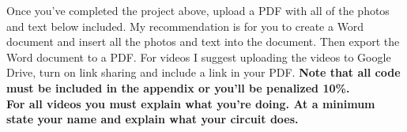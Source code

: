 Once you've completed the project above, upload a PDF with all of the photos and text
below included. My recommendation is for you to create a Word document
and insert all the photos and text into the document. Then export the
Word document to a PDF. For videos I suggest uploading the videos to
Google Drive, turn on link sharing and include a link in your
PDF. {\bf Note that all code must be included in the appendix or you'll be
penalized 10\%.}
\ \\

{\bf For all videos you must explain what you're doing. At a minimum state your name and explain what your circuit does.}
